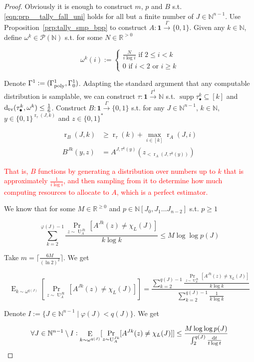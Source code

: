 \documentclass[11pt]{article}
\numberwithin{equation}{section}
\theoremstyle{definition}
\theoremstyle{plain}
\newcommand{\Bool}{\{0,1\}}
\newcommand{\Words}{{\Bool^*}}
\DeclareMathOperator{\Supp}{supp}
\DeclareMathOperator{\Prb}{Pr}
\DeclareMathOperator{\E}{E}
\DeclareMathOperator{\R}{r}
\DeclareMathOperator{\Un}{U}
\newcommand{\Dtv}{\operatorname{d}_{\textnormal{tv}}}
\newcommand{\Nats}{\mathbb{N}}
\newcommand{\Reals}{\mathbb{R}}
\newcommand{\NatPolyJ}{\Nats[J_0, J_1 \ldots J_{n-2}]}
\newcommand{\Ceil}[1]{\lceil #1 \rceil}
\newcommand{\GammaPoly}{\Gamma_{\textnormal{poly}}}
\newcommand{\Scheme}{\xrightarrow{\Gamma}}
\begin{document}
\begin{proof}

Obviously it is enough to construct ${m}$, ${p}$ and ${B}$ s.t. \ref{eqn:prp__tally_fall_uni} holds for all but a finite number of ${J \in \Nats^{n-1}}$. Use Proposition~\ref{prp:tally_smp_bpp} to construct ${A: \bm{1} \Scheme \Bool}$. Given any ${k \in \Nats}$, define ${\omega^k \in \mathcal{P}(\Nats)}$ s.t. for some ${N \in \Reals^{>0}}$

\[\omega^k(i):=\begin{cases}\frac{N}{i \log i} \text{ if } 2 \leq i < k\\0 \text{ if } i < 2 \text { or } i \geq k\end{cases}\]

Denote ${\Gamma^1:=(\GammaPoly^1,\Gamma_0^1)}$. Adapting the standard argument that any computable distribution is samplable, we can construct ${\tau: \bm{1} \xrightarrow{\Gamma^1} \Nats}$ s.t. ${\Supp \tau_\bullet^{k} \subseteq [k]}$ and ${\Dtv(\tau_\bullet^{k}, \omega^k) \leq \frac{1}{6}}$. Construct ${B: \bm{1} \Scheme \Bool}$ s.t. for any ${J \in \Nats^{n-1}}$, ${k \in \Nats}$, ${y \in \Bool^{\R_\tau(J,k)}}$ and ${z \in \Words}$

\begin{align*}
\R_B(J,k) &\geq \R_\tau(k) + \max_{i \in [k]} \R_A(J,i) \\
B^{Jk}(y,z) &= A^{J,\tau^{k}(y)}(z_{<\R_A(J,\tau^{k}(y))}) 
\end{align*}

\textcolor{red}{That is, $B$ functions by generating a distribution over numbers up to $k$ that is approximately $\frac{1}{i\log i}$, and then sampling from it to determine how much computing resources to allocate to $A$, which is a perfect estimator.}

We know that for some ${M \in \Reals^{\geq 0}}$ and ${p \in \NatPolyJ}$ s.t. ${p \geq 1}$

\[\sum_{k=2}^{\varphi(J)-1} \frac{\Prb_{z \sim \Un_A^{Jk}}[A^{Jk}(z) \neq \chi_L(J)]}{k \log k} \leq M \log \log p(J)\]

Take ${m = \Ceil{\frac{6M}{(\ln 2)^2}}}$. We get

\[\E_{k \sim \omega^{q(J)}}[\Prb_{z \sim \Un_A^{Jk}}[A^{Jk}(z) \neq \chi_L(J)]]=\frac{\sum_{k=2}^{q(J)-1} \frac{\Prb_{z \sim \Un_A^{Jk}}[A^{Jk}(z) \neq \chi_L(J)]}{k \log k}}{\sum_{k=2}^{q(J)-1} \frac{1}{k \log k}}\]

Denote $I:=\{J \in \Nats^{n-1} \mid \varphi(J) < q(J)\}$. We get

\[\forall J \in \Nats^{n-1} \setminus I: \E_{k \sim \omega^{q(J)}}[\Prb_{z \sim \Un_A^{Jk}}[A^{Jk}(z) \neq \chi_L(J)]] \leq \frac{M \log \log p(J)}{\int_2^{q(J)} \frac{\dif t}{t \log t}}\]


\end{proof}
\end{document}
